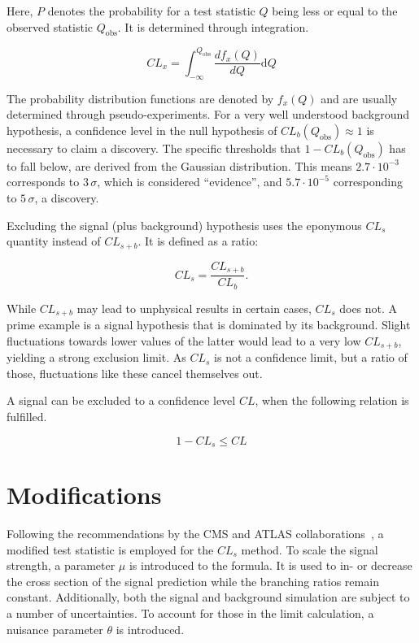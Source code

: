 \noindent Here, $P$ denotes the probability for a test statistic $Q$ being less or equal to the observed statistic $Q_{\text{obs}}$. It is determined through integration.

\begin{equation}
  \label{eq:clx}
  CL_x = \int^{Q_{\text{obs}}}_{-\infty} \frac{d f_x(Q)}{d Q} \text{d} Q
\end{equation}

\noindent The probability distribution functions are denoted by $f_x(Q)$ and are usually determined through pseudo-experiments. For a very well understood background hypothesis, a confidence level in the null hypothesis of $CL_b (Q_{\text{obs}}) \approx 1$ is necessary to claim a discovery. The specific thresholds that $1 - CL_b (Q_{\text{obs}})$ has to fall below, are derived from the Gaussian distribution. This means $2.7 \cdot 10^{-3}$ corresponds to $3\,\sigma$, which is considered ``evidence'', and $5.7 \cdot 10^{-5}$ corresponding to $5\,\sigma$, a discovery.

Excluding the signal (plus background) hypothesis uses the eponymous $CL_s$ quantity instead of $CL_{s+b}$. It is defined as a ratio:

\begin{equation}
  \label{eq:cls}
  CL_s = \frac{CL_{s+b}}{CL_b}.
\end{equation}

\noindent While $CL_{s+b}$ may lead to unphysical results in certain cases, $CL_s$ does not. A prime example is a signal hypothesis that is dominated by its background. Slight fluctuations towards lower values of the latter would lead to a very low $CL_{s+b}$, yielding a strong exclusion limit. As $CL_s$ is not a confidence limit, but a ratio of those, fluctuations like these cancel themselves out.

A signal can be excluded to a confidence level $CL$, when the following relation is fulfilled.

\begin{equation}
  \label{eq:cl-excl}
  1 - CL_s \leq CL
\end{equation}

\section{Modifications}
\label{sec:mods}

Following the recommendations by the CMS and ATLAS collaborations~\cite{clsmod}, a modified test statistic is employed for the $CL_s$ method. To scale the signal strength, a parameter $\mu$ is introduced to the formula. It is used to in- or decrease the cross section of the signal prediction while the branching ratios remain constant. Additionally, both the signal and background simulation are subject to a number of uncertainties. To account for those in the limit calculation, a nuisance parameter $\theta$ is introduced.

